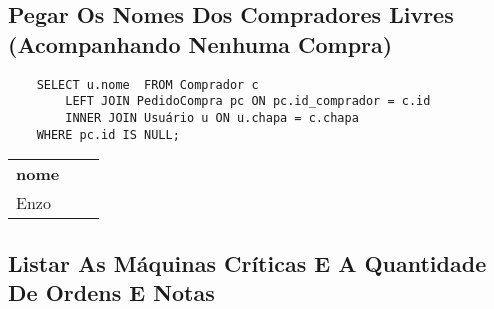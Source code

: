 \vspace{1cm}

\subsection{Pegar Os Nomes Dos Compradores Livres (Acompanhando Nenhuma Compra)}

\begin{verbatim}
    SELECT u.nome  FROM Comprador c 
        LEFT JOIN PedidoCompra pc ON pc.id_comprador = c.id
        INNER JOIN Usuário u ON u.chapa = c.chapa 
    WHERE pc.id IS NULL;
\end{verbatim}
\begin{tabularx}{1\textwidth} {
        | >{\raggedright\arraybackslash}X
        | >{\centering\arraybackslash}X
        | >{\raggedleft\arraybackslash}X |}
    \hline
    \multicolumn{1}{|c|}{Resultado} \\
    \hline
    \textbf{nome}                   \\
    \hline
    Enzo                            \\
    \hline
\end{tabularx}

\pagebreak

\subsection{Listar As Máquinas Críticas E A Quantidade De Ordens E Notas}

